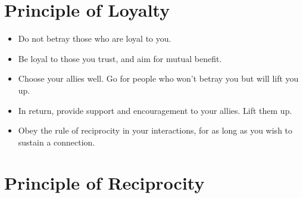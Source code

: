 \documentclass[
]{book}
\providecommand{\tightlist}{%
  \setlength{\itemsep}{0pt}\setlength{\parskip}{0pt}}
\begin{document}
\hypertarget{principle-of-loyalty}{%
\section{Principle of Loyalty}\label{principle-of-loyalty}}

\begin{itemize}
\tightlist
\item
  Do not betray those who are loyal to you.
\item
  Be loyal to those you trust, and aim for mutual benefit.
\item
  Choose your allies well. Go for people who won't betray you but will lift you up.
\item
  In return, provide support and encouragement to your allies. Lift them up.
\item
  Obey the rule of reciprocity in your interactions, for as long as you wish to sustain a connection.
\end{itemize}

\hypertarget{principle-of-reciprocity}{%
\section{Principle of Reciprocity}\label{principle-of-reciprocity}}
\end{document}
